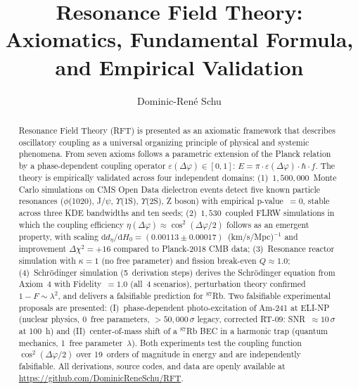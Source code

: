 \documentclass[12pt]{iopart}
\begin{document}
	
	\title{Resonance Field Theory: Axiomatics, Fundamental Formula, and
		Empirical Validation}
	
	\author{Dominic-Ren\'e Schu}
	\address{Independent Researcher, Germany\\
		\href{https://github.com/DominicReneSchu/RFT}%
		{https://github.com/DominicReneSchu/RFT}\\
		ORCID: 0009-0004-9769-9061\\
		Email: dominic.rene.schu@gmail.com}
	
	\begin{abstract}
		Resonance Field Theory (RFT) is presented as an axiomatic framework
		that describes oscillatory coupling as a universal organizing principle
		of physical and systemic phenomena. From seven axioms follows a
		parametric extension of the Planck relation by a phase-dependent
		coupling operator $\varepsilon(\Delta\varphi) \in [0,1]$:
		$E = \pi \cdot \varepsilon(\Delta\varphi) \cdot \hbar \cdot f$.
		The theory is empirically validated across four independent domains:
		(1)~$1{,}500{,}000$~Monte Carlo simulations on CMS Open Data
		dielectron events detect five known particle resonances
		($\phi$(1020), J/$\psi$, $\Upsilon$(1S), $\Upsilon$(2S), Z boson)
		with empirical p-value~$= 0$, stable across three KDE bandwidths and
		ten seeds;
		(2)~$1{,}530$~coupled FLRW simulations in which the coupling
		efficiency $\eta(\Delta\varphi) \approx \cos^2(\Delta\varphi/2)$
		follows as an emergent property, with scaling
		$\mathrm{d}d_\eta/\mathrm{d}H_0
		= (0.00113 \pm 0.00017)$~(km/s/Mpc)$^{-1}$
		and improvement $\Delta\chi^2 = +16$ compared to
		Planck-2018 CMB data;
		(3)~Resonance reactor simulation with $\kappa = 1$ (no free
		parameter) and fission break-even $Q \approx 1.0$;
		(4)~Schrödinger simulation (5~derivation steps) derives the
		Schrödinger equation from Axiom~4 with Fidelity~$= 1.0$
		(all~4 scenarios), perturbation theory confirmed
		$1-F \sim \lambda^2$, and delivers a falsifiable
		prediction for ${}^{87}$Rb.
		Two falsifiable experimental proposals are presented:
		(I)~phase-dependent photo-excitation of Am-241 at ELI-NP
		(nuclear physics, 0~free parameters, $>50{,}000\,\sigma$ legacy, corrected RT-09: SNR~$\approx 10\,\sigma$ at 100~h) and
		(II)~center-of-mass shift of a ${}^{87}$Rb BEC in a harmonic trap
		(quantum mechanics, 1~free parameter~$\lambda$). Both experiments
		test the coupling function $\cos^2(\Delta\varphi/2)$ over
		19~orders of magnitude in energy and are independently falsifiable.
		All derivations, source codes, and data are openly available at
		\url{https://github.com/DominicReneSchu/RFT}.
	\end{abstract}
	
\end{document}
